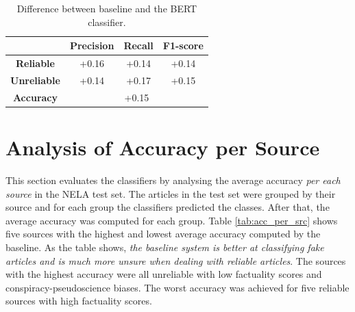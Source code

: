\begin{table}[H]
    \centering
\begin{tabular}{c|c|c|c|}
\cline{2-4}
                                          & \textbf{Precision} & \textbf{Recall} & \textbf{F1-score} \\ \hline
\multicolumn{1}{|c|}{\textbf{Reliable}}   & +0.16              & +0.14           & +0.14             \\ \hline
\multicolumn{1}{|c|}{\textbf{Unreliable}} & +0.14              & +0.17           & +0.15             \\ \hline
\multicolumn{1}{|c|}{\textbf{Accuracy}}   & \multicolumn{3}{c|}{+0.15}                               \\ \hline
\end{tabular}
    \caption{Difference between baseline and the BERT classifier.}
    \label{tab:baseline_bert_diff}
\end{table}


\section{Analysis of Accuracy per Source}
\label{sec:accuracy_per_source}
This section evaluates the classifiers by analysing the average accuracy \emph{per each source} in the NELA test set. The articles in the test set were grouped by their source and for each group the classifiers predicted the classes. After that, the average accuracy was computed for each group. Table \ref{tab:acc_per_src} shows five sources with the highest and lowest average accuracy computed by the baseline. As the table shows, \emph{the baseline system is better at classifying fake articles and is much more unsure when dealing with reliable articles}. The sources with the highest accuracy were all unreliable with low factuality scores and conspiracy-pseudoscience biases. The worst accuracy was achieved for five reliable sources with high factuality scores.

